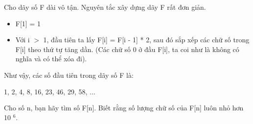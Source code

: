 Cho dãy số F dài vô tận. Nguyên tắc xây dựng dãy F rất đơn giản.  
\begin{itemize}
	\item     F[1] = 1   
	\item     Với i $>$ 1, đầu tiên ta lấy F[i] = F[i - 1] * 2, sau đó sắp xếp các chữ số trong F[i] theo thứ tự tăng dần. (Các chữ số 0 ở đầu F[i], ta coi như là không có nghĩa và có thể xóa đi).   
\end{itemize}

   Như vậy, các số đầu tiên trong dãy số F là:  

   1, 2, 4, 8, 16, 23, 46, 29, 58, ...  

   Cho số n, bạn hãy tìm số F[n]. Biết rằng số lượng chữ số của F[n] luôn nhỏ hơn 10   $^    6.   $

\